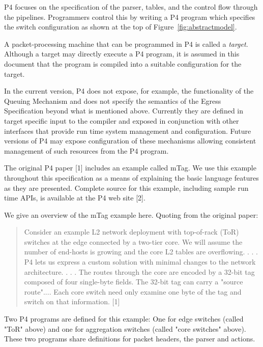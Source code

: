 \documentclass[12pt]{article}
\begin{document}
P4 focuses on the specification of the parser, \matchaction tables, and the 
control flow through the pipelines. Programmers control this by writing a 
P4 program which specifies the switch configuration as shown at the top of 
Figure~\ref{fig:abstractmodel}. 

A packet-processing machine that can be programmed in P4 is called a \textit{target}. 
Although a target may directly execute a P4 program, it is assumed in this document 
that the program is compiled into a suitable configuration for the target.

In the current version, P4 does not expose, for example, the functionality 
of the Queuing Mechanism and does not specify the semantics of the Egress 
Specification beyond what is mentioned above. Currently they are defined in 
target specific input to the compiler and exposed in conjunction with other 
interfaces that provide run time system management and configuration. Future 
versions of P4 may expose configuration of these mechanisms allowing consistent 
management of such resources from the P4 program.


The original P4 paper [1] includes an example called mTag. We use this example 
throughout this specification as a means of explaining the basic language 
features as they are presented. Complete source for this example, including 
sample run time APIs, is available at the P4 web site [2].

We give an overview of the mTag example here.  Quoting from the original paper:

\begin{quote}
Consider an example L2 network deployment with top-of-rack (ToR) switches 
at the edge connected by a two-tier core. We will assume the number of end-hosts 
is growing and the core L2 tables are overflowing. . . .  P4 lets us express a 
custom solution with minimal changes to the network architecture. . . . The routes 
through the core are encoded by a 32-bit tag composed of four single-byte 
fields.  The 32-bit tag can carry a "source route".... Each core switch need 
only examine one byte of the tag and switch on that information. [1]
\end{quote}

Two P4 programs are defined for this example: One for edge switches (called 
"ToR" above) and one for aggregation switches (called "core switches" above). 
These two programs share definitions for packet headers, the parser and actions.
\end{document}
